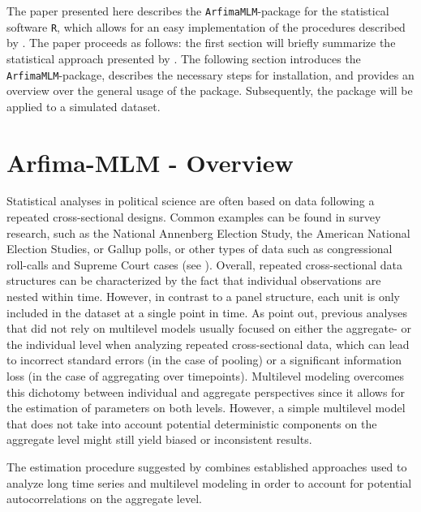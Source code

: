 \documentclass[12pt]{paper}\usepackage[]{graphicx}\usepackage[]{color}
\begin{document}
The paper presented here describes the \texttt{ArfimaMLM}-package for the statistical software \texttt{R}, which allows for an easy implementation of the procedures described by \citet{lebo2015effective}. The paper proceeds as follows: the first section will briefly summarize the statistical approach presented by \citet{lebo2015effective}. The following section introduces the \texttt{ArfimaMLM}-package, describes the necessary steps for installation, and provides an overview over the general usage of the package. Subsequently, the package will be applied to a simulated dataset.


\section{Arfima-MLM - Overview}

Statistical analyses in political science are often based on data following a repeated cross-sectional designs. Common examples can be found in survey research, such as the National Annenberg Election Study, the American National Election Studies, or Gallup polls, or other types of data such as congressional roll-calls  and Supreme Court cases (see \citealt{lebo2015effective}). Overall, repeated cross-sectional data structures can be characterized by the fact that individual observations are nested within time. However, in contrast to a panel structure, each unit is only included in the dataset at a single point in time. As \citet{lebo2015effective} point out, previous analyses that did not rely on multilevel models usually focused on either the aggregate- or the individual level when analyzing repeated cross-sectional data, which can lead to incorrect standard errors (in the case of pooling) or a significant information loss (in the case of aggregating over timepoints). Multilevel modeling overcomes this dichotomy between individual and aggregate perspectives since it allows for the estimation of parameters on both levels. However, a simple multilevel model that does not take into account potential deterministic components on the aggregate level might still yield biased or inconsistent results.

The estimation procedure suggested by \citet{lebo2015effective} combines established approaches used to analyze long time series and multilevel modeling in order to account for potential autocorrelations on the aggregate level.
\end{document}
